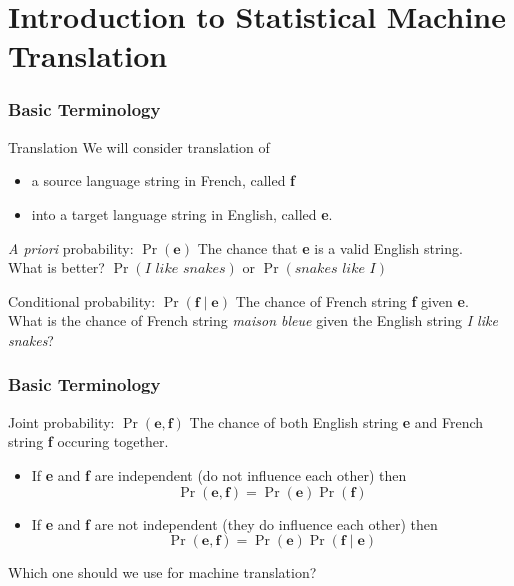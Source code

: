 




\section{Introduction to Statistical Machine Translation}
\frame{\tableofcontents[currentsection]}

\begin{frame}
\frametitle{Basic Terminology}
\begin{block}{Translation}
We will consider translation of 
\begin{itemize}
\item a source language string in French, called \textbf{f} 
\item into a target language string in English, called \textbf{e}.
\end{itemize}
\end{block}\pause
\begin{block}{\textit{A priori} probability: $\Pr(\textbf{e})$}
The chance that \textbf{e} is a valid English string.\\
What is better? $\Pr(\textit{I like snakes})$ or $\Pr(\textit{snakes like I})$
\end{block}\pause
\begin{block}{Conditional probability: $\Pr(\textbf{f} \mid \textbf{e})$}
The chance of French string \textbf{f} given \textbf{e}. \\
What is the chance of French string \textit{maison bleue} given the English string \textit{I like snakes}?
\end{block}
\end{frame}

\begin{frame}
\frametitle{Basic Terminology}
\begin{block}{Joint probability: $\Pr(\textbf{e}, \textbf{f})$}
The chance of both English string \textbf{e} and French string \textbf{f} occuring together.
\begin{itemize}[<+->]
\item If \textbf{e} and \textbf{f} are independent (do not influence each other) then 
\[ \Pr(\textbf{e}, \textbf{f}) = \Pr(\textbf{e}) \Pr(\textbf{f}) \]
\item If \textbf{e} and \textbf{f} are not independent (they do influence each other) then
\[ \Pr(\textbf{e}, \textbf{f}) = \Pr(\textbf{e}) \Pr(\textbf{f} \mid \textbf{e}) \]
\end{itemize}\pause
Which one should we use for machine translation?
\end{block}
\end{frame}

